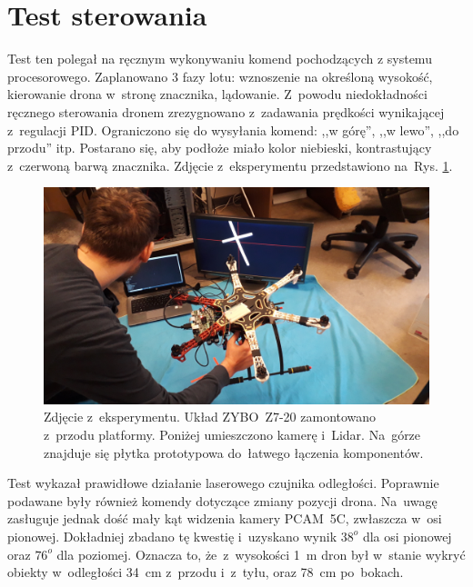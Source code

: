 \section{Test sterowania}
\label{sec:test_sterowania}
Test ten polegał na ręcznym wykonywaniu komend pochodzących z systemu procesorowego. Zaplanowano 3 fazy lotu: wznoszenie na określoną wysokość, kierowanie drona w~stronę znacznika, lądowanie. Z~powodu niedokładności ręcznego sterowania dronem zrezygnowano z~zadawania prędkości wynikającej z~regulacji PID. Ograniczono się do wysyłania komend: ,,w górę'', ,,w lewo'', ,,do przodu'' itp. Postarano się, aby podłoże miało kolor niebieski, kontrastujący z~czerwoną barwą znacznika. Zdjęcie z~eksperymentu przedstawiono na~Rys. \ref{fig:eksperyment}.\\
\begin{figure}[h]
	\centering
	\includegraphics[width=\textwidth]{eksperyment.jpg}
	\caption{Zdjęcie z~eksperymentu. Układ ZYBO~Z7-20 zamontowano z~przodu platformy. Poniżej umieszczono kamerę i~Lidar. Na~górze znajduje się płytka prototypowa do~łatwego łączenia komponentów.}
	\label{fig:eksperyment}
\end{figure}
Test wykazał prawidłowe działanie laserowego czujnika odległości. Poprawnie podawane były również komendy dotyczące zmiany pozycji drona. Na~uwagę zasługuje jednak dość mały kąt widzenia kamery PCAM~5C, zwłaszcza w~osi pionowej. Dokładniej zbadano tę kwestię i~uzyskano wynik $38^o$ dla osi pionowej oraz $76^o$ dla poziomej. Oznacza to, że~z~wysokości 1~m dron był w~stanie wykryć obiekty w~odległości 34~cm z~przodu i~z~tyłu, oraz 78~cm po~bokach.

